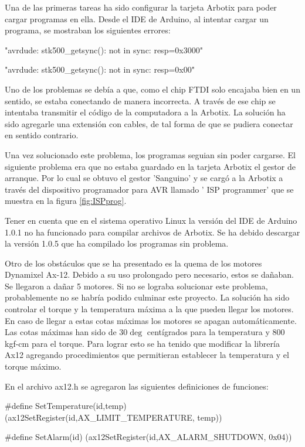 Una de las primeras tareas ha sido configurar la tarjeta Arbotix para poder cargar programas en ella. Desde el IDE de Arduino, al intentar cargar un programa, se mostraban los siguientes errores:

"avrdude: stk500\_getsync(): not in sync: resp=0x3000"

"avrdude: stk500\_getsync(): not in sync: resp=0x00"

Uno de los problemas se debía a que, como el chip FTDI solo encajaba bien en un sentido, se estaba conectando de manera incorrecta. A través de ese chip se intentaba transmitir el código de la computadora a la Arbotix. La solución ha sido agregarle una extensión con cables, de tal forma de que se pudiera conectar en sentido contrario. 

Una vez solucionado este problema, los programas seguian sin poder cargarse. El siguiente problema era que no estaba guardado en la tarjeta Arbotix el gestor de arranque. Por lo cual se obtuvo el gestor 'Sanguino' y se cargó a la Arbotix a través del dispositivo programador para AVR llamado ' ISP programmer' que se muestra en la figura \ref{fig:ISPprog}. 



Tener en cuenta que en el sistema operativo Linux la versión del IDE de Arduino 1.0.1 no ha funcionado para compilar archivos de Arbotix. Se ha debido descargar la versión 1.0.5 que ha compilado los programas sin problema. 

Otro de los obstáculos que se ha presentado es la quema de los motores Dynamixel Ax-12. Debido a su uso prolongado pero necesario, estos se dañaban. Se llegaron a dañar 5 motores. Si no se lograba solucionar este problema, probablemente no se habría podido culminar este proyecto. La solución ha sido controlar el torque y la temperatura máxima a la que pueden llegar los motores. En caso de llegar a estas cotas máximas los motores se apagan automáticamente. Las cotas máximas han sido de $30\deg$ centígrados para la temperatura y 800 kgf-cm para el torque. Para lograr esto se ha tenido que modificar la librería Ax12 agregando procedimientos que permitieran establecer la temperatura y el torque máximo.

En el archivo ax12.h se agregaron las siguientes definiciones de funciones:

\#define SetTemperature(id,temp) (ax12SetRegister(id,AX\_LIMIT\_TEMPERATURE, temp))

\#define SetAlarm(id) (ax12SetRegister(id,AX\_ALARM\_SHUTDOWN, 0x04)) 

